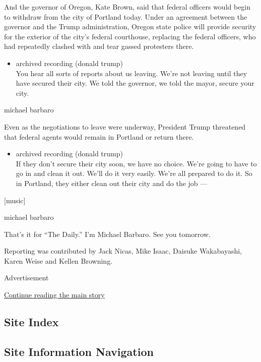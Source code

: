 And the governor of Oregon, Kate Brown, said that federal officers would
begin to withdraw from the city of Portland today. Under an agreement
between the governor and the Trump administration, Oregon state police
will provide security for the exterior of the city's federal courthouse,
replacing the federal officers, who had repeatedly clashed with and tear
gassed protesters there.

\begin{itemize}
\tightlist
\item
  archived recording (donald trump)\\
  You hear all sorts of reports about us leaving. We're not leaving
  until they have secured their city. We told the governor, we told the
  mayor, secure your city.
\end{itemize}

michael barbaro

Even as the negotiations to leave were underway, President Trump
threatened that federal agents would remain in Portland or return there.

\begin{itemize}
\tightlist
\item
  archived recording (donald trump)\\
  If they don't secure their city soon, we have no choice. We're going
  to have to go in and clean it out. We'll do it very easily. We're all
  prepared to do it. So in Portland, they either clean out their city
  and do the job ---
\end{itemize}

{[}music{]}

michael barbaro

That's it for ``The Daily.'' I'm Michael Barbaro. See you tomorrow.

Reporting was contributed by Jack Nicas, Mike Isaac, Daisuke
Wakabayashi, Karen Weise and Kellen Browning.

Advertisement

\protect\hyperlink{after-bottom}{Continue reading the main story}

\hypertarget{site-index}{%
\subsection{Site Index}\label{site-index}}

\hypertarget{site-information-navigation}{%
\subsection{Site Information
Navigation}\label{site-information-navigation}}

